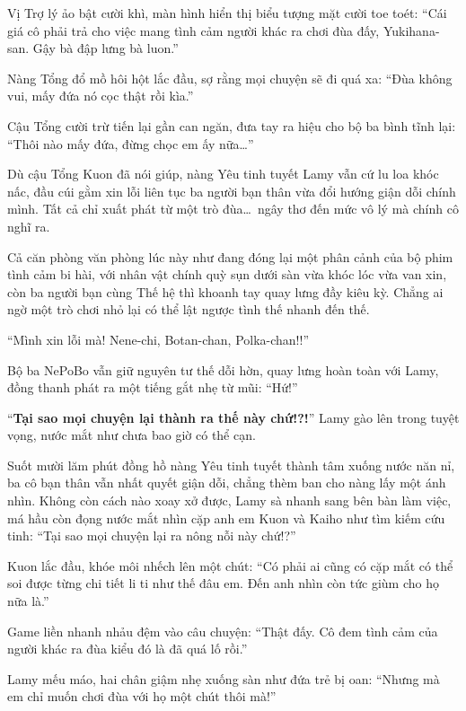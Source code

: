 \documentclass[../main.tex]{subfiles}
\begin{document}
Vị Trợ lý ảo bật cười khì, màn hình hiển thị biểu tượng mặt cười toe toét: ``Cái giá cô phải trả cho việc mang tình cảm người khác ra chơi đùa đấy, Yukihana-san. Gậy bà đập lưng bà luon.''

Nàng Tổng đổ mồ hôi hột lắc đầu, sợ rằng mọi chuyện sẽ đi quá xa: ``Đùa không vui, mấy đứa nó cọc thật rồi kìa.''

Cậu Tổng cười trừ tiến lại gần can ngăn, đưa tay ra hiệu cho bộ ba bình tĩnh lại: ``Thôi nào mấy đứa, đừng chọc em ấy nữa\dots''

Dù cậu Tổng Kuon đã nói giúp, nàng Yêu tinh tuyết Lamy vẫn cứ lu loa khóc nấc, đầu cúi gằm xin lỗi liên tục ba người bạn thân vừa đổi hướng giận dỗi chính mình. Tất cả chỉ xuất phát từ một trò đùa\dots\ ngây thơ đến mức vô lý mà chính cô nghĩ ra.
\omk

Cả căn phòng văn phòng lúc này như đang đóng lại một phân cảnh của bộ phim tình cảm bi hài, với nhân vật chính quỳ sụn dưới sàn vừa khóc lóc vừa van xin, còn ba người bạn cùng Thế hệ thì khoanh tay quay lưng đầy kiêu kỳ. Chẳng ai ngờ một trò chơi nhỏ lại có thể lật ngược tình thế nhanh đến thế.

``Mình xin lỗi mà! Nene-chi, Botan-chan, Polka-chan!!''

Bộ ba NePoBo vẫn giữ nguyên tư thế dỗi hờn, quay lưng hoàn toàn với Lamy, đồng thanh phát ra một tiếng gắt nhẹ từ mũi: ``Hứ!''

``\textbf{Tại sao mọi chuyện lại thành ra thế này chứ!?!}'' Lamy gào lên trong tuyệt vọng, nước mắt như chưa bao giờ có thể cạn.

Suốt mười lăm phút đồng hồ nàng Yêu tinh tuyết thành tâm xuống nước năn nỉ, ba cô bạn thân vẫn nhất quyết giận dỗi, chẳng thèm ban cho nàng lấy một ánh nhìn. Không còn cách nào xoay xở được, Lamy sà nhanh sang bên bàn làm việc, má hầu còn đọng nước mắt nhìn cặp anh em Kuon và Kaiho như tìm kiếm cứu tinh: ``Tại sao mọi chuyện lại ra nông nỗi này chứ!?''

Kuon lắc đầu, khóe môi nhếch lên một chút: ``Có phải ai cũng có cặp mắt có thể soi được từng chi tiết li ti như thế đâu em. Đến anh nhìn còn tức giùm cho họ nữa là.''

Game liền nhanh nhảu đệm vào câu chuyện: ``Thật đấy. Cô đem tình cảm của người khác ra đùa kiểu đó là đã quá lố rồi.''

Lamy mếu máo, hai chân giậm nhẹ xuống sàn như đứa trẻ bị oan: ``Nhưng mà em chỉ muốn chơi đùa với họ một chút thôi mà!''
\end{document}
